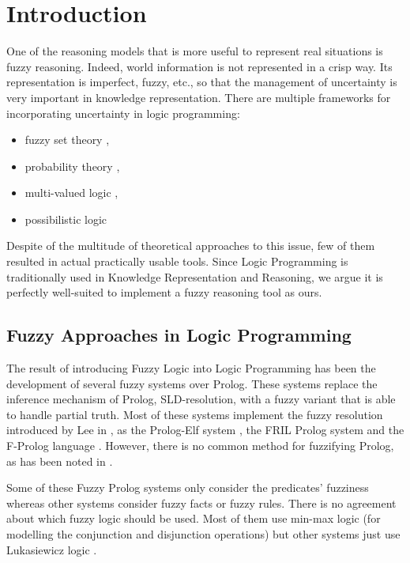 \documentclass[runningheads,a4paper]{llncs}
\begin{document}
\section{Introduction}
\label{sec:intro}

One of the reasoning models that is more useful to represent real
situations is fuzzy reasoning. Indeed, world information is not
represented in a crisp way. Its representation is imperfect, fuzzy,
etc., so that the management of uncertainty is very important in
knowledge representation. 
There are multiple frameworks for incorporating 
uncertainty in logic programming:

\begin{itemize}
     \item fuzzy set theory \cite{Cao00,Shapiro83,Emden86},
     \item probability theory
     \cite{Fuhr00,LakshmananShiri94,Lukasiewicz01,Ng91,Ng93},
     \item multi-valued logic
     \cite{Fitting91,Kifer88,Kifer92,Lakshmanan94,Lakshmanan01,Subrahmanian87},
     \item possibilistic logic \cite{Dubois91,Wagner97,Wagner98}
\end{itemize}

Despite of the multitude of theoretical approaches to this issue, 
few of them resulted in actual practically usable tools.
Since Logic Programming is traditionally used in 
Knowledge Representation and Reasoning, 
we argue it is perfectly well-suited to implement 
a fuzzy reasoning tool as ours.

\subsection{Fuzzy Approaches in Logic Programming}
\label{sec:approaches}

The result of introducing Fuzzy Logic into Logic Programming has been
the development of several fuzzy systems over Prolog. These systems
replace the inference mechanism of Prolog, SLD-resolution, with a
fuzzy variant that is able to handle partial truth. Most of these
systems implement the fuzzy resolution introduced by Lee in
\cite{lee1}, as 
the Prolog-Elf system \cite{ishizuka85prologelf}, 
the FRIL Prolog system \cite{fril} and 
the F-Prolog language \cite{li90fuzzy}. 
However, there is no common method for fuzzifying Prolog, 
as has been noted in \cite{Shen}. 

Some of these Fuzzy Prolog systems only consider the predicates' 
fuzziness whereas other systems consider fuzzy facts or fuzzy rules. 
There is no agreement about which fuzzy logic should be used. 
Most of them use min-max logic 
(for modelling the conjunction and disjunction operations) 
but other systems just use Lukasiewicz logic
\cite{klawonn94lukasiewicz}.
\end{document}
